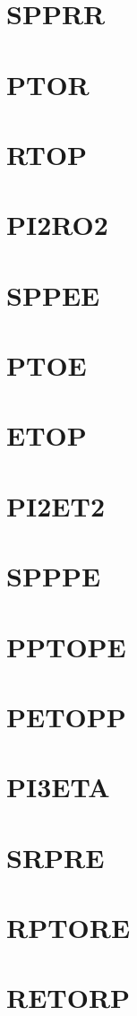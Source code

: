 \documentclass[14pt,UTF8]{ctexbook}
\begin{document}
\section{SPPRR}
\section{PTOR}
\section{RTOP}
\section{PI2RO2}
\section{SPPEE}
\section{PTOE}
\section{ETOP}
\section{PI2ET2}
\section{SPPPE}
\section{PPTOPE}
\section{PETOPP}
\section{PI3ETA}
\section{SRPRE}
\section{RPTORE}
\section{RETORP}
\end{document}
